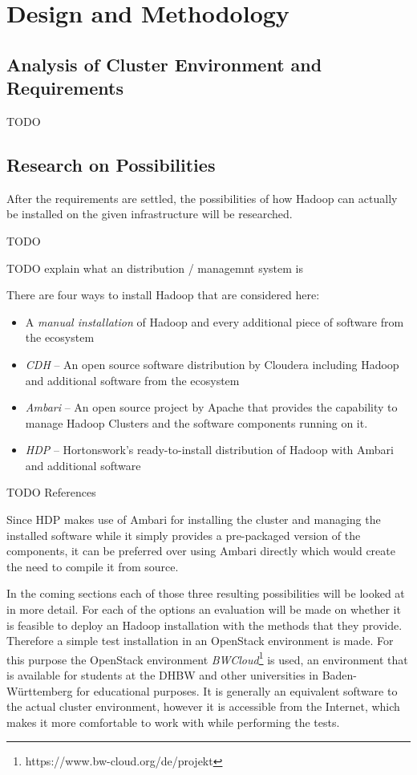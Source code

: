 \chapter{Design and Methodology}
\label{chap:design}

\section{Analysis of Cluster Environment and Requirements}

TODO

\section{Research on Possibilities}

After the requirements are settled,
the possibilities of how Hadoop can actually be installed 
on the given infrastructure will be researched.

TODO

TODO explain what an distribution / managemnt system is

There are four ways to install Hadoop that are considered here:

\begin{itemize}
    \item A \emph{manual installation} of Hadoop 
        and every additional piece of software from the ecosystem
    \item \emph{\ac{CDH}} --  An open source software distribution by Cloudera including Hadoop
        and additional software from the ecosystem
    \item \emph{Ambari} -- An open source project by Apache that provides
        the capability to manage Hadoop Clusters and the software components running on it.
    \item \emph{\ac{HDP}} -- Hortonswork's ready-to-install distribution of Hadoop 
        with Ambari and additional software
\end{itemize}

TODO References

Since \ac{HDP} makes use of Ambari for installing the cluster and managing the installed software while it simply provides a pre-packaged version of the components, 
it can be preferred over using Ambari directly which would create the need to compile it from source.

In the coming sections each of those three resulting possibilities will be looked at in more detail.
For each of the options an evaluation will be made on whether it is 
feasible to deploy an Hadoop installation with the methods that they provide.
Therefore a simple test installation in an OpenStack environment is made.
For this purpose the OpenStack environment \emph{BWCloud}\footnote{https://www.bw-cloud.org/de/projekt} 
is used, an environment that is available for students at the \ac{DHBW} 
and other universities in Baden-Württemberg for educational purposes. 
It is generally an equivalent software to the actual cluster environment, 
however it is accessible from the Internet, 
which makes it more comfortable to work with while performing the tests.

